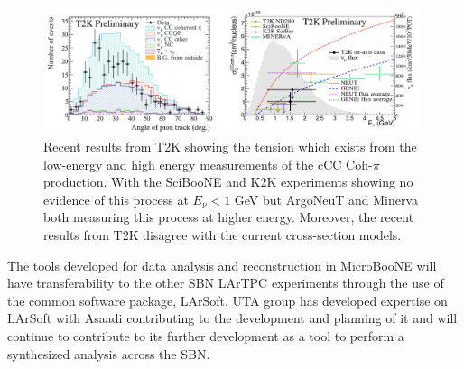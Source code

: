 \begin{figure}[htb]
\centering
\includegraphics[width=0.98\textwidth]{images/CCCohPion.png}
\caption[]{Recent results from T2K \cite{T2K} showing the tension which exists from the low-energy and high energy measurements of the cCC Coh-$\pi$ production. With the SciBooNE and K2K experiments showing no evidence of this process at $E_{\nu} < 1$ GeV but ArgoNeuT and Minerva both measuring this process at higher energy. Moreover, the recent results from T2K disagree with the current cross-section models.}
\label{fig:cccohpion}
\end{figure}


The tools developed for data analysis and reconstruction in MicroBooNE will have transferability to the other SBN LArTPC experiments through the use of the common software package, LArSoft. UTA group has developed expertise on LArSoft with Asaadi contributing to the development and planning of it and will continue to contribute to its further development as a tool to perform a synthesized analysis across the SBN.
